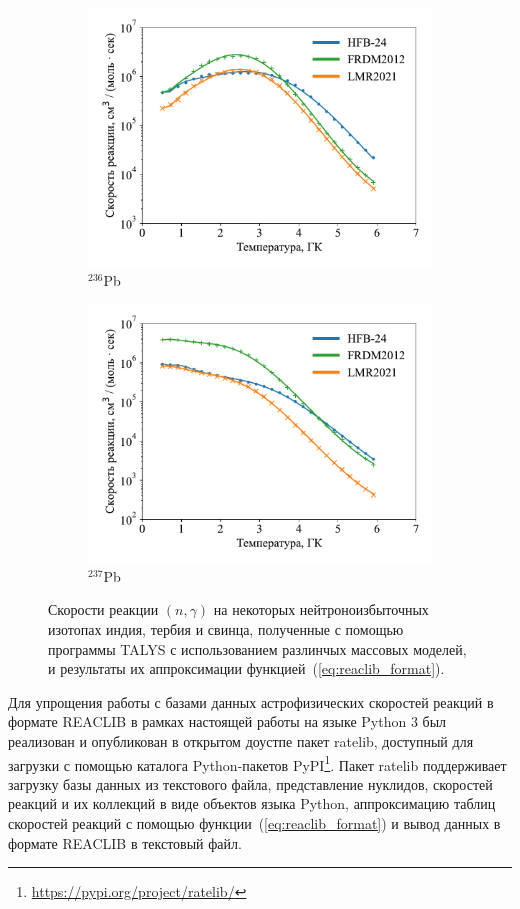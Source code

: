 \begin{figure}
\begin{subfigure}{0.48\textwidth}
    \includegraphics[width=\textwidth]{pics/n_pb236.pdf}
    \caption{${}^{236}$Pb}
  \end{subfigure}
  \hfil
  \begin{subfigure}{0.48\textwidth}
    \centering
    \includegraphics[width=\textwidth]{pics/n_pb237.pdf}
    \caption{${}^{237}$Pb}
  \end{subfigure}

  \caption{Скорости реакции $(n,\gamma)$ на некоторых нейтроноизбыточных изотопах индия, тербия и свинца, полученные с помощью программы TALYS с использованием разлинчых массовых моделей, и результаты их аппроксимации функцией~(\ref{eq:reaclib_format}).}
  \label{fig:ng_approx}
\end{figure}

Для упрощения работы с базами данных астрофизических скоростей реакций в формате REACLIB в рамках настоящей работы на языке Python 3 был реализован и опубликован в открытом доустпе пакет ratelib, доступный для загрузки с помощью каталога Python-пакетов PyPI\footnote{\href{https://pypi.org/project/ratelib/}{https://pypi.org/project/ratelib/}}. Пакет ratelib поддерживает загрузку базы данных из текстового файла, представление нуклидов, скоростей реакций и их коллекций в виде объектов языка Python, аппроксимацию таблиц скоростей реакций с помощью функции~(\ref{eq:reaclib_format}) и вывод данных в формате REACLIB в текстовый файл.
